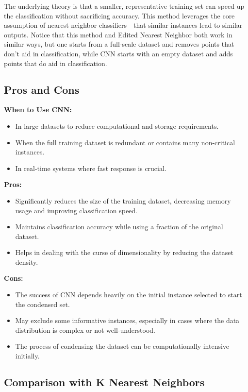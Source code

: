 \documentclass[12pt]{article}
\begin{document}
The underlying theory is that a smaller, representative training set can speed up the classification without sacrificing accuracy. This method leverages the core assumption of nearest neighbor classifiers—that similar instances lead to similar outputs. Notice that this method and Edited Nearest Neighbor both work in similar ways, but one starts from a full-scale dataset and removes points that don't aid in classification, while CNN starts with an empty dataset and adds points that do aid in classification.

\subsection{Pros and Cons}

\textbf{When to Use CNN:}
\begin{itemize}
    \item In large datasets to reduce computational and storage requirements.
    \item When the full training dataset is redundant or contains many non-critical instances.
    \item In real-time systems where fast response is crucial.
\end{itemize}

\textbf{Pros:}
\begin{itemize}
    \item Significantly reduces the size of the training dataset, decreasing memory usage and improving classification speed.
    \item Maintains classification accuracy while using a fraction of the original dataset.
    \item Helps in dealing with the curse of dimensionality by reducing the dataset density.
\end{itemize}

\textbf{Cons:}
\begin{itemize}
    \item The success of CNN depends heavily on the initial instance selected to start the condensed set.
    \item May exclude some informative instances, especially in cases where the data distribution is complex or not well-understood.
    \item The process of condensing the dataset can be computationally intensive initially.
\end{itemize}

\subsection{Comparison with K Nearest Neighbors}
\end{document}
